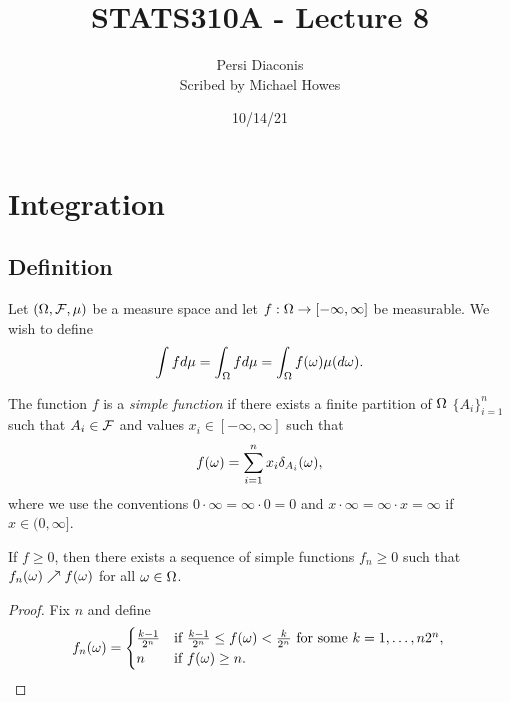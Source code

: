 




\title{STATS310A - Lecture 8}
\author{Persi Diaconis\\ Scribed by Michael Howes}
\date{10/14/21}

\pagestyle{fancy}
\fancyhf{}


\maketitle
\tableofcontents
\section{Integration}
\subsection{Definition}
Let $({{\Omega}}, {\mathcal{F}}, \mu)$ be a measure space and let $f: {{\Omega}} \to [-\infty, \infty]$ be measurable. We wish to define
\[\int f d\mu = \int_{{\Omega}} f d\mu = \int_{{\Omega}} f({\omega}) \mu(d{\omega}). \]
\begin{defn}
    The function $f$ is a \emph{simple function} if there exists a finite partition of ${{\Omega}}$ $\{A_i\}_{i=1}^n$ such that $A_i \in {\mathcal{F}}$ and values $x_i \in [-\infty,\infty]$ such that 
    \[f({\omega}) = \sum_{i=1}^n x_i \delta_{A_i}({\omega}), \]
    where we use the conventions $0\cdot \infty = \infty \cdot 0 = 0$ and $x \cdot\infty = \infty \cdot x= \infty$ if $x\in(0,\infty]$.
\end{defn}
\begin{lemma}
    If $f \ge 0$, then there exists a sequence of simple functions $f_n \ge 0$ such that $f_n({\omega})\nearrow f({\omega})$ for all ${\omega} \in {{\Omega}}$.
\end{lemma}
\begin{proof}
    Fix $n$ and define
    \[f_n({\omega}) = \begin{cases}
        \frac{k-1}{2^n} & \text{if } \frac{k-1}{2^n}\le f({\omega}) < \frac{k}{2^n} \text{ for some } k =1,\ldots, n2^n,\\
        n & \text{if } f({\omega}) \ge n.
    \end{cases} \qedhere\]
\end{proof}
